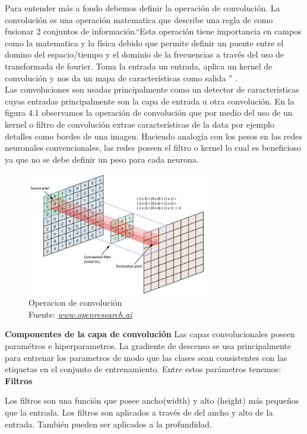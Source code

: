 Para entender más a fondo debemos definir la operación de convolución.  La convolución es una operación matematica que describe una regla de como fusionar 2 conjuntos de información.\textquotedblleft Esta operación tiene importancia en campos como la matematica y la física debido que permite definir un puente entre el domino del espacio/tiempo y el dominio de la frecuencias a través del uso de transformada de fourier. Toma la entrada un entrada, aplica un kernel de convolución y nos da un mapa de características como salida \textquotedblright \cite{book1} .\\
Las convoluciones son usadas principalmente como un detector de características cuyas entradas principalmente son la capa de entrada u otra convolución.
En la figura 4.1 observamos la operación de convolución que por medio del uso de un kernel o filtro de convolución extrae características de la data por ejemplo detalles como bordes de una imagen. Haciendo analogía con los pesos en las redes neuronales convencionales, las redes poseen el filtro o kernel lo cual es beneficioso ya que no se debe definir un peso para cada neurona.
\begin{figure}[H]
	\centering
	\includegraphics[width=0.7\textwidth]{Figures/convolucion.jpeg}
	\caption{Operacion de convolución \\ Fuente:  \href{http://openresearch.ai/t/network-in-network/39}{\textit{www.openresearch.ai}}}
	\label{convolucion}
\end{figure} 

\textbf{Componentes de la capa de convolución}
Las capas convolucionales poseen paramétros e hiperparametros. La gradiente de descenso se usa principalmente para entrenar los parametros de modo que las clases sean consistentes con las etiquetas en el conjunto de entrenamiento. Entre estos parámetros tenemos:
\textbf{Filtros}

Los filtros son una función que posee ancho(width) y alto (height) más pequeños que la entrada. Los filtros son aplicados a través de  del ancho y alto de la entrada. También pueden ser aplicados a la profundidad.

